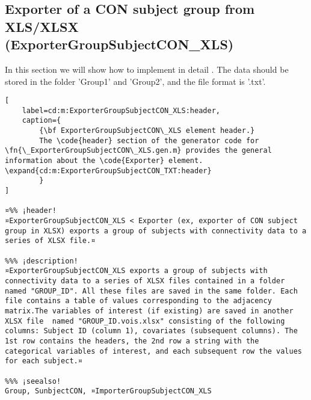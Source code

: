 \documentclass{tufte-handout}
\begin{document}
\subsection{Exporter of a CON subject group from XLS/XLSX (ExporterGroupSubjectCON\_XLS)}

In this section we will show how to implement in detail . The data should be stored in the folder 'Group1' and 'Group2', and the file format is '.txt'.

\begin{lstlisting}[
	label=cd:m:ExporterGroupSubjectCON_XLS:header,
	caption={
		{\bf ExporterGroupSubjectCON\_XLS element header.}
		The \code{header} section of the generator code for \fn{\_ExporterGroupSubjectCON\_XLS.gen.m} provides the general information about the \code{Exporter} element. \expand{cd:m:ExporterGroupSubjectCON_TXT:header}
		}
]

¤%% ¡header!
¤ExporterGroupSubjectCON_XLS < Exporter (ex, exporter of CON subject group in XLSX) exports a group of subjects with connectivity data to a series of XLSX file.¤

%%% ¡description!
¤ExporterGroupSubjectCON_XLS exports a group of subjects with connectivity data to a series of XLSX files contained in a folder named "GROUP_ID". All these files are saved in the same folder. Each file contains a table of values corresponding to the adjacency matrix.The variables of interest (if existing) are saved in another XLSX file  named "GROUP_ID.vois.xlsx" consisting of the following columns: Subject ID (column 1), covariates (subsequent columns). The 1st row contains the headers, the 2nd row a string with the categorical variables of interest, and each subsequent row the values for each subject.¤

%%% ¡seealso!
Group, SunbjectCON, ¤ImporterGroupSubjectCON_XLS

\end{lstlisting}
\end{document}
